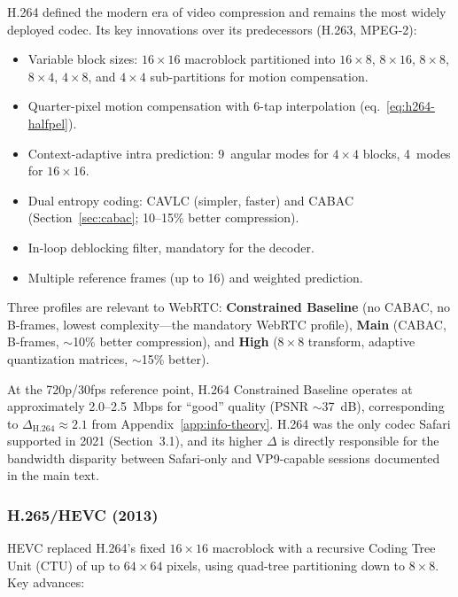 H.264 defined the modern era of video compression and remains the most
widely deployed codec. Its key innovations over its predecessors (H.263,
MPEG-2):

\begin{itemize}
\item Variable block sizes: $16\!\times\!16$ macroblock partitioned into
  $16\!\times\!8$, $8\!\times\!16$, $8\!\times\!8$, $8\!\times\!4$,
  $4\!\times\!8$, and $4\!\times\!4$ sub-partitions for motion
  compensation.

\item Quarter-pixel motion compensation with 6-tap interpolation
  (eq.~\ref{eq:h264-halfpel}).

\item Context-adaptive intra prediction: 9~angular modes for
  $4\!\times\!4$ blocks, 4~modes for $16\!\times\!16$.

\item Dual entropy coding: CAVLC (simpler, faster) and CABAC
  (Section~\ref{sec:cabac}; 10--15\% better compression).

\item In-loop deblocking filter, mandatory for the decoder.

\item Multiple reference frames (up to 16) and weighted prediction.
\end{itemize}

Three profiles are relevant to WebRTC: \textbf{Constrained Baseline}
(no CABAC, no B-frames, lowest complexity---the mandatory WebRTC profile),
\textbf{Main} (CABAC, B-frames, ${\sim}$10\% better compression), and
\textbf{High} ($8\!\times\!8$ transform, adaptive quantization matrices,
${\sim}$15\% better).

At the 720p/30fps reference point, H.264 Constrained Baseline operates at
approximately 2.0--2.5~Mbps for ``good'' quality (PSNR ${\sim}$37~dB),
corresponding to $\Delta_{\text{H.264}} \approx 2.1$ from
Appendix~\ref{app:info-theory}. H.264 was the only codec Safari supported
in 2021 (Section~3.1), and its higher $\Delta$ is directly responsible
for the bandwidth disparity between Safari-only and VP9-capable sessions
documented in the main text.

\subsubsection{H.265/HEVC (2013)}
\label{sec:hevc}

HEVC replaced H.264's fixed $16\!\times\!16$ macroblock with a recursive
Coding Tree Unit (CTU) of up to $64\!\times\!64$ pixels, using quad-tree
partitioning down to $8\!\times\!8$. Key advances:

